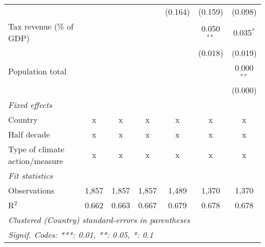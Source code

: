\begin{tabular}{lcccccc}
                                                        &         &         &                & (0.164)        & (0.159)        & (0.098)\\   
   Tax revenue (\% of GDP)                              &         &         &                &                & 0.050$^{**}$   & 0.035$^{*}$\\   
                                                        &         &         &                &                & (0.018)        & (0.019)\\   
   Population total                                     &         &         &                &                &                & 0.000$^{**}$\\   
                                                        &         &         &                &                &                & (0.000)\\   
   \emph{Fixed effects}\\
   Country                                              & x       & x       & x              & x              & x              & x\\  
   Half decade                                          & x       & x       & x              & x              & x              & x\\  
   Type of climate action/measure                       & x       & x       & x              & x              & x              & x\\  
   \midrule \emph{Fit statistics}\\
   Observations                                         & 1,857   & 1,857   & 1,857          & 1,489          & 1,370          & 1,370\\  
   R$^2$                                                & 0.662   & 0.663   & 0.667          & 0.679          & 0.678          & 0.678\\  
   \midrule
   \multicolumn{7}{l}{\emph{Clustered (Country) standard-errors in parentheses}}\\
   \multicolumn{7}{l}{\emph{Signif. Codes: ***: 0.01, **: 0.05, *: 0.1}}\\
\end{tabular}
\par\endgroup



